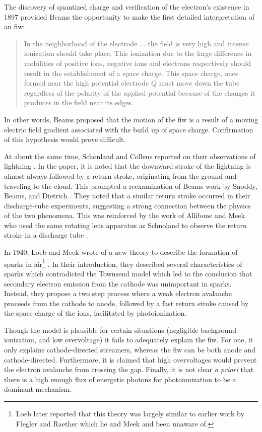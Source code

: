The discovery of quantized charge and verification of the electron's existence
in 1897 \cite{Thomson1897} provided Beams the opportunity to make the first
detailed interpretation of an \acs{fiw}:
\begin{quote}
  In the neighborhood of the electrode $\ldots{}$ the field is very high and
  intense ionization should take place. This ionization due to the large
  difference in mobilities of positive ions, negative ions and electrons
  respectively should result in the establishment of a space charge. This space
  charge, once formed near the high potential electrode $Q$ must move down the
  tube regardless of the polarity of the applied potential because of the
  changes it produces in the field near its edges.
\end{quote}
In other words, Beams proposed that the motion of the \acs{fiw} is a result of a
moving electric field gradient associated with the build up of space charge.
Confirmation of this hypothesis would prove difficult.

At about the same time, Schonland and Collens reported on their observations
of lightning \cite{Schonland1933}. In the paper, it is noted that the
downward stroke of the lightning is almost always followed by a return
stroke, originating from the ground and traveling to the cloud. This prompted a
reexamination of Beams work by Snoddy, Beams, and Dietrich \cite{Snoddy1936}.
They noted that a similar return stroke occurred in their discharge-tube
experiments, suggesting a strong connection between the physics of the two
phenomena. This was reinforced by the work of Allibone and Meek who used the
same rotating lens apparatus as Schnoland to observe the return stroke in a
discharge tube \cite{Allibone1938}.

In 1940, Loeb and Meek wrote of a new theory to describe the formation of sparks
in air\footnote{Loeb later reported \cite{Loeb1965} that this theory was largely
similar to earlier work by Flegler and Raether \cite{Flegler1936} which he and
Meek and been unaware of.} \cite{Loeb1940}. In their introduction, they
described several characteristics of sparks which contradicted the Townsend
model which led to the conclusion that secondary electron emission from the
cathode was unimportant in sparks. Instead, they propose a two step process
where a weak electron avalanche proceeds from the cathode to anode, followed by
a fast return stroke caused by the space charge of the ions, facilitated by
photoionization.

Though the model is plausible for certain situations (negligible background
ionization, and low overvoltage) it fails to adequately explain the \acs{fiw}.
For one, it only explains cathode-directed streamers, whereas the \acs{fiw} can
be both anode and cathode-directed. Furthermore, it is claimed that high
overvoltages would prevent the electron avalanche from crossing the gap.
Finally, it is not clear \emph{a priori} that there is a high enough flux of
energetic photons for photoionization to be a dominant mechanism.

